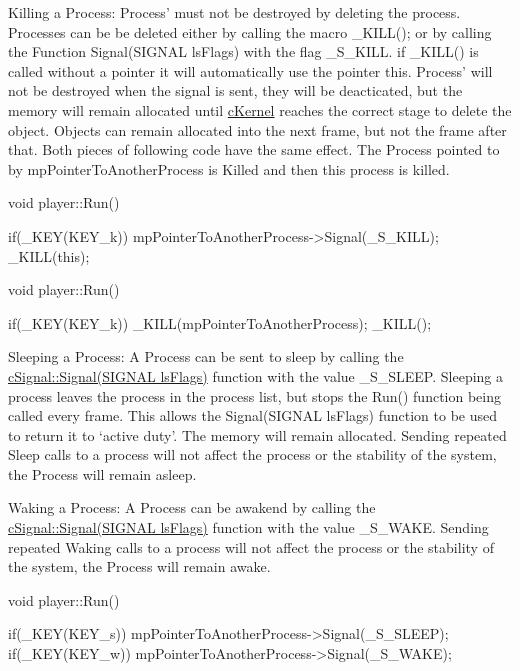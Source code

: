 Killing a Process: Process' must not be destroyed by deleting the process. Processes can be be deleted either by calling the macro \_\-KILL(); or by calling the Function Signal(SIGNAL lsFlags) with the flag \_\-S\_\-KILL. if \_\-KILL() is called without a pointer it will automatically use the pointer this. Process' will not be destroyed when the signal is sent, they will be deacticated, but the memory will remain allocated until \hyperlink{classc_kernel}{cKernel} reaches the correct stage to delete the object. Objects can remain allocated into the next frame, but not the frame after that. Both pieces of following code have the same effect. The Process pointed to by mpPointerToAnotherProcess is Killed and then this process is killed. 
\begin{DoxyCode}
 void player::Run()
 {

 if(_KEY(KEY_k))
 {
 mpPointerToAnotherProcess->Signal(_S_KILL);
 _KILL(this);
 }

 }
\end{DoxyCode}



\begin{DoxyCode}
 void player::Run()
 {

 if(_KEY(KEY_k))
        {
         _KILL(mpPointerToAnotherProcess);
         _KILL();
        }

 }
\end{DoxyCode}


Sleeping a Process: A Process can be sent to sleep by calling the \hyperlink{classc_signal_a545074be1da41d00050bed3cd2fb2305}{cSignal::Signal(SIGNAL lsFlags)} function with the value \_\-S\_\-SLEEP. Sleeping a process leaves the process in the process list, but stops the Run() function being called every frame. This allows the Signal(SIGNAL lsFlags) function to be used to return it to ‘active duty’. The memory will remain allocated. Sending repeated Sleep calls to a process will not affect the process or the stability of the system, the Process will remain asleep.

Waking a Process: A Process can be awakend by calling the \hyperlink{classc_signal_a545074be1da41d00050bed3cd2fb2305}{cSignal::Signal(SIGNAL lsFlags)} function with the value \_\-S\_\-WAKE. Sending repeated Waking calls to a process will not affect the process or the stability of the system, the Process will remain awake. 
\begin{DoxyCode}
 void player::Run()
 {

 if(_KEY(KEY_s)) mpPointerToAnotherProcess->Signal(_S_SLEEP);
 if(_KEY(KEY_w)) mpPointerToAnotherProcess->Signal(_S_WAKE);

 }
\end{DoxyCode}


